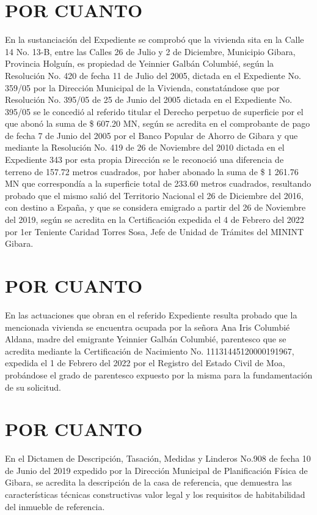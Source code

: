 \documentclass[11pt,letterpaper]{article}
\begin{document}
    \section{POR CUANTO}
        En la sustanciación del Expediente se comprobó que la vivienda sita en la Calle 14 No. 13-B, entre las Calles 26 de Julio y 2 de Diciembre, Municipio Gibara, Provincia Holguín, es propiedad de Yeinnier Galbán Columbié, según la Resolución No. 420 de fecha 11 de Julio del 2005, dictada en el Expediente No. 359/05 por la Dirección Municipal de la Vivienda,  constatándose que por Resolución No. 395/05 de 25 de Junio del 2005 dictada en el Expediente No. 395/05 se le concedió al referido titular el Derecho perpetuo de superficie por el que abonó la suma de \$ 607.20 MN, según se acredita en el comprobante de pago de fecha 7 de Junio del 2005 por el Banco Popular de Ahorro de Gibara y que mediante la Resolución No. 419 de 26 de Noviembre del 2010 dictada en el Expediente 343 por esta propia Dirección se le reconoció una diferencia de terreno de 157.72 metros cuadrados, por haber abonado la suma de \$ 1 261.76 MN que correspondía a la superficie total de 233.60 metros cuadrados, resultando probado que el mismo salió del Territorio Nacional el 26 de Diciembre del 2016, con destino a España, y que se considera emigrado a partir del 26 de Noviembre del 2019,  según se acredita en la Certificación expedida el 4 de Febrero del 2022 por 1er Teniente Caridad Torres Sosa, Jefe de Unidad  de Trámites del MININT Gibara.   
    \section{POR CUANTO}
        En las actuaciones que obran en el referido Expediente resulta probado que la mencionada vivienda se encuentra ocupada por la señora Ana Iris Columbié Aldana,  madre del emigrante Yeinnier Galbán Columbié, parentesco que se acredita mediante la Certificación de Nacimiento No. 11131445120000191967, expedida el 1 de Febrero  del 2022 por el Registro del Estado Civil de Moa, probándose el grado de parentesco expuesto por la misma para la fundamentación de su solicitud.    
    \section{POR CUANTO}
        En el Dictamen de Descripción, Tasación, Medidas y Linderos No.908 de fecha 10 de Junio del 2019 expedido por la Dirección Municipal de Planificación Física de Gibara, se acredita la descripción de la casa de referencia, que demuestra las características técnicas constructivas valor legal y los requisitos de habitabilidad del inmueble de referencia.
\end{document}
